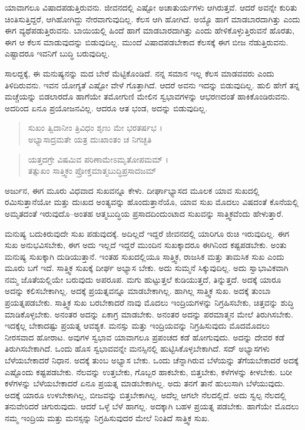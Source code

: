 ಯಾವಾಗಲೂ ವಿಷಾದಪಡುತ್ತಿರುವನು. ಜೀವನದಲ್ಲಿ ಎಷ್ಟೋ ಅಚಾತುರ್ಯಗಳು ಆಗಿರುತ್ತವೆ. ಆದರೆ ಅವನ್ನೇ ಕುರಿತು ಚಿಂತಿಸುತ್ತಿದ್ದರೆ, ಆಗಿಹೋಗಿದ್ದು ನೇರವಾಗುವುದಿಲ್ಲ. ಕೆಲಸ ಆಗಿ ಹೋಗಿದೆ. ಅಯ್ಯೊ ಹಾಗೆ ಮಾಡಬಾರದಾಗಿತ್ತು ಎಂದು ಈಗ ವ್ಯಥೆಪಡುತ್ತಿರುವನು. ಬಾಯಿಯಲ್ಲಿ ಹಿಂದೆ ಹಾಗೆ ಮಾಡಬಾರದಾಗಿತ್ತು ಎಂದು ಹೇಳಿಕೊಳ್ಳುತ್ತಿರುವನೆ ಹೊರತು, ಈಗ ಆ ಕೆಲಸ ಮಾಡುವುದನ್ನು ಬಿಡುವುದಿಲ್ಲ. ಮುಂದೆ ವಿಷಾದಪಡಬೇಕಾದ ಕೆಲಸಕ್ಕೆ ಈಗ ಬೀಜ ನೆಡುತ್ತಿರುವನು. ಎಷ್ಟಾದರೂ ಇವನಿಗೆ ಬುದ್ಧಿ ಬರುವುದಿಲ್ಲ.

ಸಾಲದ್ದಕ್ಕೆ, ಈ ಮನುಷ್ಯನನ್ನು ಮದ ಬೇರೆ ಮೆಟ್ಟಿಕೊಂಡಿದೆ. ನನ್ನ ಸಮಾನ ಇಲ್ಲ ಕೆಲಸ ಮಾಡವವರು ಎಂದು ತಿಳಿದಿರುವನು. ಇವನ ಯೋಗ್ಯತೆ ಎಷ್ಟೋ ವೇಳೆ ಗೊತ್ತಾಗಿದೆ. ಆದರೆ ಅವನು ಇದನ್ನು ಬಿಡುವುದಿಲ್ಲ. ಹುಲಿ ಹೇಗೆ ತನ್ನ ಮಚ್ಚೆಯನ್ನು ಬಿಡಲಾರದೊ ಹಾಗೆಯೇ ತಮೋಗುಣಿ ಮೇಲಿನ ಸ್ವಭಾವಗಳನ್ನು ಆಭರಣದಂತೆ ಹಾಕಿಕೊಂಡಿರುವನು. ಅದರಿಂದ ಏನೂ ಪ್ರಯೋಜನವಿಲ್ಲ. ಆದರೂ ಆತ ಭಂಡ, ಅದನ್ನು ಬಿಡುವುದಿಲ್ಲ.

\begin{verse}
ಸುಖಂ ತ್ವಿದಾನೀಂ ತ್ರಿವಿಧಂ ಶೃಣು ಮೇ ಭರತರ್ಷಭ ।\\ಅಭ್ಯಾಸಾದ್ರಮತೇ ಯತ್ರ ದುಃಖಾಂತಂ ಚ ನಿಗಚ್ಛತಿ 
\end{verse}

\begin{verse}
ಯತ್ತದಗ್ರೇ ವಿಷಮಿವ ಪರಿಣಾಮೇಽಮೃತೋಪಮಮ್ ।\\ತತ್ಸುಖಂ ಸಾತ್ತ್ವಿಕಂ ಪ್ರೋಕ್ತಮಾತ್ಮಬುದ್ಧಿಪ್ರಸಾದಜಮ್ 
\end{verse}

{\small ಅರ್ಜುನ, ಈಗ ಮೂರು ವಿಧವಾದ ಸುಖವನ್ನೂ ಕೇಳು. ದೀರ್ಘಾಭ್ಯಾಸದ ಮೂಲಕ ಯಾವ ಸುಖದಲ್ಲಿ ರಮಿಸುತ್ತಾನೆಯೋ ಮತ್ತು ದುಃಖದ ಅಂತ್ಯವನ್ನು ಹೊಂದುತ್ತಾನೆಯೊ, ಯಾವ ಸುಖ ಮೊದಲು ವಿಷದಂತೆ ಕೊನೆಯಲ್ಲಿ ಅಮೃತದಂತೆ ಇರುವುದೊ--ಅಂತಹ ಆತ್ಮಬುದ್ಧಿಯ ಪ್ರಸಾದದಿಂದುಂಟಾದ ಸುಖವನ್ನು ಸಾತ್ತ್ವಿಕವೆಂದು ಹೇಳುತ್ತಾರೆ.}

ಮನುಷ್ಯ ಬದುಕಿರುವುದೇ ಸುಖ ಪಡುವುದಕ್ಕೆ. ಅದಿಲ್ಲದೆ ಇದ್ದರೆ ಜೀವನದಲ್ಲಿ ಯಾರಿಗೂ ರುಚಿ ಇರುವುದಿಲ್ಲ. ಈಗ ಸುಖ ಅನುಭವಿಸಬೇಕು, ಈಗ ಅದು ಇಲ್ಲದೆ ಇದ್ದರೆ ಮುಂದಿನ ಸುಖಕ್ಕಾದರೂ ಈಗಿನಿಂದ ಕಷ್ಟಪಡಬೇಕು. ಅಂತು ಮನುಷ್ಯ ಸುಖಕ್ಕಾಗಿ ದುಡಿಯುತ್ತಾನೆ. ಇಂತಹ ಸುಖದಲ್ಲಿಯೂ ಸಾತ್ತ್ವಿಕ, ರಾಜಸಿಕ ಮತ್ತು ತಾಮಸಿಕ ಸುಖ ಎಂದು ಮೂರು ಬಗೆ ಇದೆ. ಸಾತ್ತ್ವಿಕ ಸುಖಕ್ಕೆ ದೀರ್ಘ ಅಭ್ಯಾಸ ಬೇಕು. ಅದು ಸುಮ್ಮನೆ ಸಿಕ್ಕುವುದಿಲ್ಲ. ಅದು ಸ್ವಾಭಾವಿಕವಾಗಿ ನಮ್ಮ ಜೊತೆಯಲ್ಲಿಯೇ ಬರುವುದು ಅಪರೂಪ. ಮಗು ಹುಟ್ಟುತ್ತಲೆ ಕುಡಿಯುತ್ತದೆ, ತಿನ್ನುತ್ತದೆ. ಅದಕ್ಕೆ ಯಾರೂ ಅದನ್ನು ಕಲಿಸಬೇಕಾಗಿಲ್ಲ. ಅದಕ್ಕೆ ಪ್ರಯತ್ನವನ್ನೂ ಮಾಡಬೇಕಾಗಿಲ್ಲ. ಹಾಗಿಲ್ಲ ಸಾತ್ತ್ವಿಕ ಸುಖ. ಅದಕ್ಕೆ ತುಂಬಾ ಪ್ರಯತ್ನಪಡಬೇಕು. ಸಾತ್ತ್ವಿಕ ಸುಖ ಬರಬೇಕಾದರೆ ನಾವು ಮೊದಲು ಇಂದ್ರಿಯಗಳನ್ನು ನಿಗ್ರಹಿಸಬೇಕು, ಚಿತ್ತವನ್ನು ಶುದ್ಧಿ ಮಾಡಿಕೊಳ್ಳಬೇಕು. ಅನಂತರ ಅದನ್ನು ಏಕಾಗ್ರ ಮಾಡಬೇಕು. ಅನಂತರ ಅದನ್ನು ಪರಮಾತ್ಮನ ಮೇಲೆ ತಿರುಗಿಸಬೇಕು. ಇದಕ್ಕೆಲ್ಲ ಬೇಕಾದಷ್ಟು ಪ್ರಯತ್ನ ಆವಶ್ಯಕ. ಮನಸ್ಸು ಮತ್ತು ಇಂದ್ರಿಯವನ್ನು ನಿಗ್ರಹಿಸುವುದು ಮೊದಮೊದಲು ನೀರಸವಾದ ಹೋರಾಟ. ಅವುಗಳ ಸ್ವಭಾವ ಯಾವಾಗಲೂ ಪ್ರಪಂಚದ ಕಡೆ ಹೋಗುವುದು. ಅದನ್ನು ದೇವರ ಕಡೆ ತಿರುಗಿಸಬೇಕಾಗಿದೆ. ಒಂದು ಹೊಸ ಸ್ವಭಾವವನ್ನೇ ಮನಸ್ಸಿನಲ್ಲಿ ಹುಟ್ಟಿಸಿಕೊಳ್ಳಬೇಕಾಗಿದೆ. ಸದ್ ಅಭ್ಯಾಸಗಳು ಬೆಳೆಯಬೇಕಾದರೆ ನಿಧಾನ. ಅದಕ್ಕೆ ತುಂಬ ಅಭ್ಯಾಸ ಬೇಕು. ಒಂದು ಚೆನ್ನಾಗಿರುವ ಬೆಳೆಯನ್ನು ತೆಗೆಯಬೇಕಾದರೆ ಅದಕ್ಕೆ ಎಷ್ಟೊಂದು ಕಷ್ಟಪಡಬೇಕು. ನೆಲವನ್ನು ಉತ್ತಬೇಕು, ಗೊಬ್ಬರ ಹಾಕಬೇಕು, ಬಿತ್ತಬೇಕು, ಕಳೆಗಳನ್ನು ಕೀಳಬೇಕು. ಬರೀ ಕಳೆಗಳನ್ನು ಬೆಳೆಯಬೇಕಾದರೆ ಏನೂ ಪ್ರಯತ್ನ ಮಾಡಬೇಕಾಗಿಲ್ಲ. ಅದು ತನಗೆ ತಾನೆ ಹುಲುಸಾಗಿ ಬೆಳೆಯುವುದು. ಅದಕ್ಕೆ ಯಾರೂ ಉಳಬೇಕಾಗಿಲ್ಲ, ಬೀಜವನ್ನು ಬಿತ್ತಬೇಕಾಗಿಲ್ಲ. ಅದೆಲ್ಲ ಆಗಲೇ ನೆಲದಲ್ಲಿದೆ. ಅದು ಸ್ವಲ್ಪ ನೆಲದಲ್ಲಿ ತನುವೇರಿದರೆ ಚಿಗುರುವುದು. ಆದರೆ ಒಳ್ಳೆ ಬೆಳೆ ಹಾಗಲ್ಲ. ಅದಕ್ಕಾಗಿ ಬಹಳ ಪ್ರಯತ್ನ ಪಡಬೇಕು. ಹಾಗೆಯೇ ಮೊದಲು ನಮ್ಮ ಇಂದ್ರಿಯ ಮತ್ತು ಮನಸ್ಸನ್ನು ನಿಗ್ರಹಿಸುವುದರ ಮೇಲೆ ನಿಂತಿದೆ ಸಾತ್ತ್ವಿಕ ಸುಖ.

